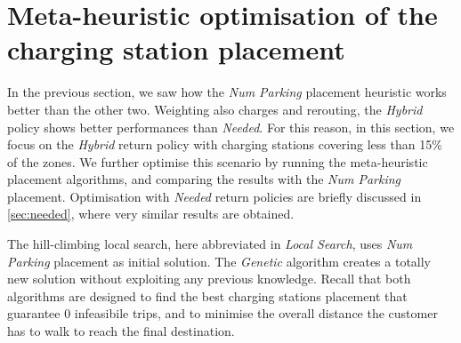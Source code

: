 \section{Meta-heuristic optimisation of the charging station placement}
\label{sec:opt}



In the previous section, we saw how the \textit{Num Parking} placement heuristic works better than the other two.
Weighting also charges and rerouting, the \textit{Hybrid} policy shows better performances than \textit{Needed}. For this reason, in this section, we focus on the \textit{Hybrid} return policy with charging stations covering less than 15\% of the zones. We further optimise this scenario by running the meta-heuristic placement algorithms, and comparing the results with the \textit{Num Parking} placement. 
Optimisation with \textit{Needed} return policies are briefly discussed in \ref{sec:needed}, where very similar results are obtained.  

The hill-climbing local search, here abbreviated in \textit{Local Search}, uses \textit{Num Parking} placement as initial solution. The \textit{Genetic} algorithm creates a totally new solution without exploiting any previous knowledge. 
Recall that both algorithms are designed to find the best charging stations placement that guarantee 0 infeasibile trips, and to minimise the overall distance the customer has to walk to reach the final destination.


